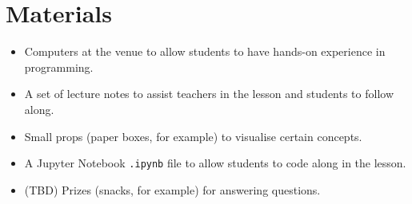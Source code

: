 \documentclass{article}
\def\t{teachers }
\def\s{students }
\begin{document}
\section*{Materials}

\begin{itemize}
\item Computers at the venue to allow \s to have hands-on experience in programming.
\item A set of lecture notes to assist \t in the lesson and \s to follow along.
\item Small props (paper boxes, for example) to visualise certain concepts.
\item A Jupyter Notebook \texttt{.ipynb} file to allow \s to code along in the lesson.
\item (TBD) Prizes (snacks, for example) for answering questions.
\end{itemize}
\end{document}
